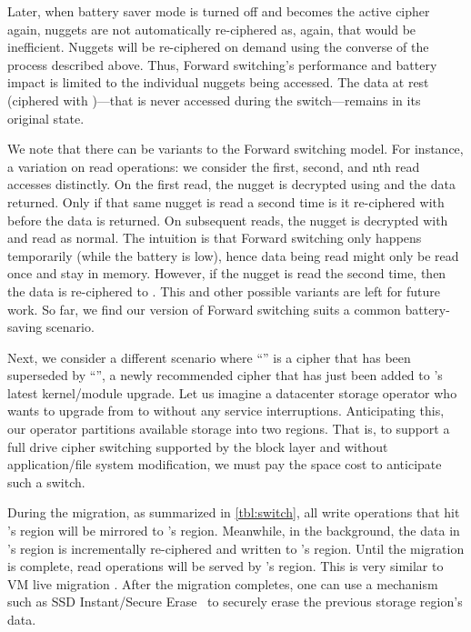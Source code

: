 Later, when battery saver mode is turned off and \cone becomes the
active cipher again, nuggets are not automatically re-ciphered as,
again, that would be inefficient. Nuggets will be re-ciphered on
demand using the converse of the process described above. Thus,
Forward switching's performance and battery impact is limited to the
individual nuggets being accessed.  The data at rest (ciphered with
\cone)---that is never accessed during the switch---remains in its
original state.

We note that there can be variants to the Forward switching model. For instance,
a variation on read operations: we consider the first, second, and nth read
accesses distinctly. On the first read, the nugget is decrypted using \cone and
the data returned. Only if that same nugget is read a second time is it
re-ciphered with \ctwo before the data is returned. On subsequent reads, the
nugget is decrypted with \ctwo and read as normal. The intuition is that Forward
switching only happens temporarily (\eg while the battery is low), hence data
being read might only be read once and stay in memory. However, if the nugget is
read the second time, then the data is re-ciphered to \ctwo. This and other
possible variants are left for future work. So far, we find our version of
Forward switching suits a common battery-saving scenario.



 Next, we consider a different scenario where
``\cone'' is a cipher that has been superseded by ``\ctwo'', a newly recommended
cipher that has just been added to \sys's latest kernel/module upgrade. Let us
imagine a datacenter storage operator who wants to upgrade from \cone to \ctwo
without any service interruptions. Anticipating this, our operator partitions
available storage into two regions. That is, to support a full drive cipher
switching supported by the block layer and without application/file system
modification, we must pay the space cost to anticipate such a switch.

During the migration, as summarized in \cref{tbl:switch}, all write operations
that hit \cone's region will be mirrored to \ctwo's region. Meanwhile, in the
background, the data in \cone's region is incrementally re-ciphered and written
to \ctwo's region. Until the migration is complete, read operations will be
served by \cone's region. This is very similar to VM live migration
\cite{live-vm-migration}. After the migration completes, one can use a mechanism
such as SSD Instant/Secure Erase~\cite{ISE1,ISE2,ISE3} to securely erase the
previous storage region's data.

